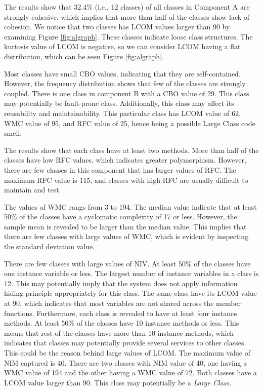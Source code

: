 The results show that 32.4\% (i.e., 12 classes) of all classes in Component A are strongly cohesive, which implies that more than half of the classes show lack of cohesion. We notice that two classes has LCOM values larger than 90 by examining Figure \ref{fig:algraph}. These classes indicate loose class structures. The kurtosis value of LCOM is negative, so we can consider LCOM having a flat distribution, which can be seen Figure \ref{fig:algraph}. 

Most classes have small CBO values, indicating that they are self-contained. However, the frequency distribution shows that few of the classes are strongly coupled. There is one class in component B with a CBO value of 29. This class may potentially be fault-prone class. Additionally, this class may affect its reusability and maintainability. This particular class has LCOM value of 62, WMC value of 95, and RFC value of 25, hence being a possible Large Class code smell.

The results show that each class have at least two methods. More than half of the classes have low RFC values, which indicates greater polymorphism. However, there are few classes in this component that has larger values of RFC. The maximum RFC value is 115, and classes with high RFC are usually difficult to maintain and test. 

The values of WMC rangs from 3 to 194. The median value indicate that at least 50\% of the classes have a cyclomatic complexity of 17 or less. However, the sample mean is revealed to be larger than the median value. This implies that there are few classes with large values of WMC, which is evident by inspecting the standard deviation value.

There are few classes with large values of NIV. At least 50\% of the classes have one instance variable or less. The largest number of instance variables in a class is 12. This may potentially imply that the system does not apply information hiding principle appropriately for this class. The same class have its LCOM value at 90, which indicates that most variables are not shared across the member functions. Furthermore, each class is revealed to have at least four instance methods. At least 50\% of the classes have 10 instance methods or less. This means that rest of the classes have more than 10 instance methods, which indicates that classes may potentially provide several services to other classes. This could be the reason behind large values of LCOM. The maximum value of NIM captured is 40. There are two classes with NIM value of 40, one having a WMC value of 194 and the other having a WMC value of 72. Both classes have a LCOM value larger than 90. This class may potentially be a \textit{Large Class}.


